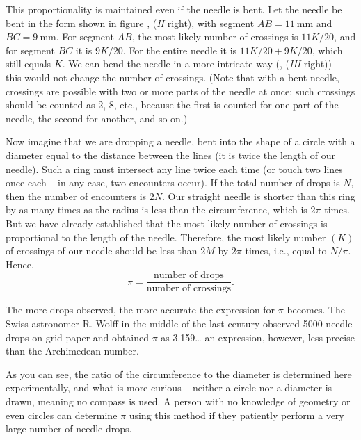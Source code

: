 This proportionality is maintained even if the needle is bent. Let the needle be bent in the form shown in figure , (\emph{II} right), with segment $AB = \SI{11}{\milli\meter}$ and $BC = \SI{9}{\milli\meter}$. For segment $AB$, the most likely number of crossings is $11K/20$, and for segment $BC$ it is $9K/20$. For the entire needle it is $ 11K/20 + 9K/20$, which still equals $K$. We can bend the needle in a more intricate way (, (\emph{III} right)) -- this would not change the number of crossings. (Note that with a bent needle, crossings are possible with two or more parts of the needle at once; such crossings should be counted as 2, 8, etc., because the first is counted for one part of the needle, the second for another, and so on.)

Now imagine that we are dropping a needle, bent into the shape of a circle with a diameter equal to the distance between the lines (it is twice the length of our needle). Such a ring must intersect any line twice each time (or touch two lines once each -- in any case, two encounters occur). If the total number of drops is $N$, then the number of encounters is $2N$. Our straight needle is shorter than this ring by as many times as the radius is less than the circumference, which is $2\pi$ times. But we have already established that the most likely number of crossings is proportional to the length of the needle. Therefore, the most likely number $(K)$ of crossings of our needle should be less than $2M$ by $2\pi$ times, i.e., equal to $N/\pi$. Hence,
\begin{equation*}%
 \pi = \frac{\text{number of drops}}{\text{number of crossings}}.\end{equation*}

The more drops observed, the more accurate the expression for $\pi$ becomes. The Swiss astronomer R. Wolff in the middle of the last century observed 5000 needle drops on grid paper and obtained $\pi$ as 3.159\dots{} an expression, however, less precise than the Archimedean number.

As you can see, the ratio of the circumference to the diameter is determined here experimentally, and what is more curious -- neither a circle nor a diameter is drawn, meaning no compass is used. A person with no knowledge of geometry or even circles can determine $\pi$ using this method if they patiently perform a very large number of needle drops.


